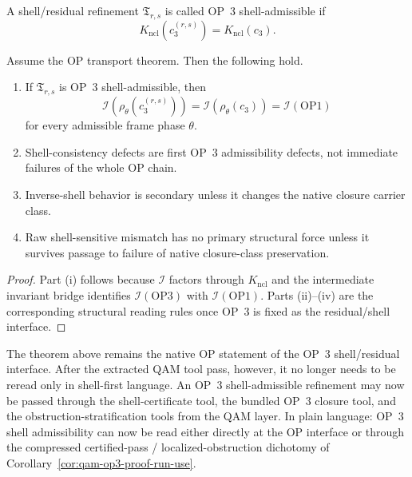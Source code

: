 \begin{definition}
A shell/residual refinement $\mathfrak{T}_{r,s}$ is called OP~3 shell-admissible if
\[
K_{\mathrm{ncl}}(c_{3}^{(r,s)})=K_{\mathrm{ncl}}(c_{3}).
\]
\end{definition}

\begin{theorem}
\label{thm:op3-shell}
Assume the OP transport theorem. Then the following hold.
\begin{enumerate}[leftmargin=2em,label=(\roman*)]
\item If $\mathfrak{T}_{r,s}$ is OP~3 shell-admissible, then
\[
\mathcal{I}(\rho_{\theta}(c_{3}^{(r,s)}))=\mathcal{I}(\rho_{\theta}(c_{3}))=\mathcal{I}(\mathrm{OP1})
\]
for every admissible frame phase $\theta$.
\item Shell-consistency defects are first OP~3 admissibility defects, not immediate failures of the whole OP chain.
\item Inverse-shell behavior is secondary unless it changes the native closure carrier class.
\item Raw shell-sensitive mismatch has no primary structural force unless it survives passage to failure of native closure-class preservation.
\end{enumerate}
\end{theorem}

\begin{proof}
Part (i) follows because $\mathcal{I}$ factors through $K_{\mathrm{ncl}}$ and the intermediate invariant bridge identifies $\mathcal{I}(\mathrm{OP3})$ with $\mathcal{I}(\mathrm{OP1})$. Parts (ii)--(iv) are the corresponding structural reading rules once OP~3 is fixed as the residual/shell interface.
\end{proof}

\begin{remark}
The theorem above remains the native OP statement of the OP~3 shell/residual interface. After the extracted QAM tool pass, however, it no longer needs to be reread only in shell-first language. An OP~3 shell-admissible refinement may now be passed through the shell-certificate tool, the bundled OP~3 closure tool, and the obstruction-stratification tools from the QAM layer. In plain language: OP~3 shell admissibility can now be read either directly at the OP interface or through the compressed certified-pass / localized-obstruction dichotomy of Corollary~\ref{cor:qam-op3-proof-run-use}.
\end{remark}

